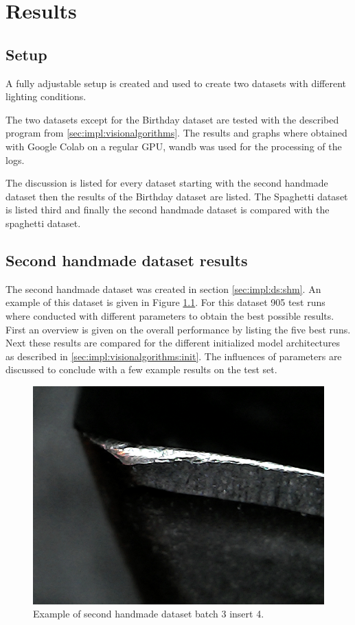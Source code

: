 \chapter{Results}
\label{chap:results}

\section{Setup}
A fully adjustable setup is created and used to create two datasets with different lighting conditions.

The two datasets except for the Birthday dataset are tested with the described program from \ref{sec:impl:visionalgorithms}. The results and graphs where obtained with Google Colab on a regular GPU, wandb was used for the processing of the logs.

The discussion is listed for every dataset starting with the second handmade dataset then the results of the Birthday dataset are listed. The Spaghetti dataset is listed third and finally the second handmade dataset is compared with the spaghetti dataset.



\section{Second handmade dataset results}
The second handmade dataset was created in section \ref{sec:impl:ds:shm}. An example of this dataset is given in Figure \ref{fig:res:shm:example}. For this dataset 905 test runs where conducted with different parameters to obtain the best possible results. First an overview is given on the overall performance by listing the five best runs. Next these results are compared for the different initialized model architectures as described in \ref{sec:impl:visionalgorithms:init}. The influences of parameters are discussed to conclude with a few example results on the test set.

\begin{figure}[hbtp]
\centering
\includegraphics[width=.3\textwidth]{fig/Vision/Dataset/handmade_datasets/Second_handmade_dataset/b_003_p_004_s.jpg}
\caption{Example of second handmade dataset batch 3 insert 4.}
\label{fig:res:shm:example}
\end{figure}

